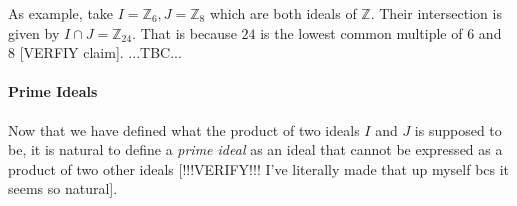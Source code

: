 \medskip
As example, take $I = \mathbb{Z}_6, J = \mathbb{Z}_8$ which are both ideals of $\mathbb{Z}$. Their intersection is given by $I \cap J = \mathbb{Z}_{24}$. That is because $24$ is the lowest common multiple of $6$ and $8$ [VERFIY claim]. ...TBC...

% 


%
%
%
%

\paragraph{Prime Ideals} Now that we have defined what the product of two ideals $I$ and $J$ is supposed to be, it is natural to define a \emph{prime ideal} as an ideal that cannot be expressed as a product of two other ideals [!!!VERIFY!!! I've literally made that up myself bcs it seems so natural].

